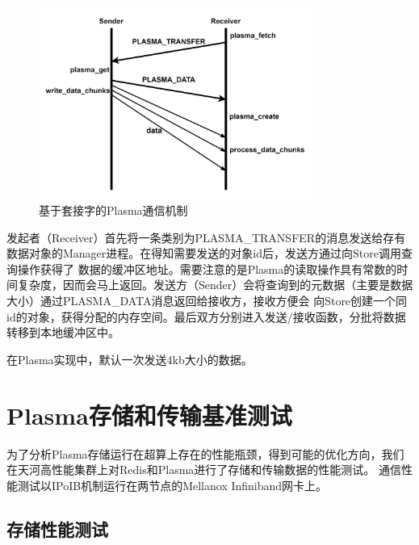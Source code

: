 \begin{figure}[h] 
    \centering
    \includegraphics[width=0.8\textwidth]{image/chap02/sock_protocol.png}
    \caption{基于套接字的Plasma通信机制}
    \label{fig:sock_protocol}
\end{figure}

发起者（Receiver）首先将一条类别为PLASMA\_TRANSFER的消息发送给存有数据对象的Manager进程。在得知需要发送的对象id后，发送方通过向Store调用查询操作获得了
数据的缓冲区地址。需要注意的是Plasma的读取操作具有常数的时间复杂度，因而会马上返回。发送方（Sender）会将查询到的元数据（主要是数据大小）通过PLASMA\_DATA消息返回给接收方，接收方便会
向Store创建一个同id的对象，获得分配的内存空间。最后双方分别进入发送/接收函数，分批将数据转移到本地缓冲区中。

在Plasma实现中，默认一次发送4kb大小的数据。

\section{Plasma存储和传输基准测试}

为了分析Plasma存储运行在超算上存在的性能瓶颈，得到可能的优化方向，我们在天河高性能集群上对Redis和Plasma进行了存储和传输数据的性能测试。
通信性能测试以IPoIB机制运行在两节点的Mellanox Infiniband网卡上。

\subsection{存储性能测试}

